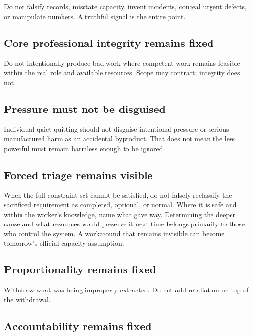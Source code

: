 \documentclass[11pt,oneside]{article}
\begin{document}
Do not falsify records, misstate capacity, invent incidents, conceal
urgent defects, or manipulate numbers. A truthful signal is the entire
point.

\hypertarget{core-professional-integrity-remains-fixed}{%
\subsection{Core professional integrity remains
fixed}\label{core-professional-integrity-remains-fixed}}

Do not intentionally produce bad work where competent work remains
feasible within the real role and available resources. Scope may
contract; integrity does not.

\hypertarget{pressure-must-not-be-disguised}{%
\subsection{Pressure must not be
disguised}\label{pressure-must-not-be-disguised}}

Individual quiet quitting should not disguise intentional pressure or
serious manufactured harm as an accidental byproduct. That does not mean
the less powerful must remain harmless enough to be ignored.

\hypertarget{forced-triage-remains-visible}{%
\subsection{Forced triage remains
visible}\label{forced-triage-remains-visible}}

When the full constraint set cannot be satisfied, do not falsely
reclassify the sacrificed requirement as completed, optional, or normal.
Where it is safe and within the worker's knowledge, name what gave way.
Determining the deeper cause and what resources would preserve it next
time belongs primarily to those who control the system. A workaround
that remains invisible can become tomorrow's official capacity
assumption.

\hypertarget{proportionality-remains-fixed}{%
\subsection{Proportionality remains
fixed}\label{proportionality-remains-fixed}}

Withdraw what was being improperly extracted. Do not add retaliation on
top of the withdrawal.

\hypertarget{accountability-remains-fixed}{%
\subsection{Accountability remains
fixed}\label{accountability-remains-fixed}}
\end{document}
